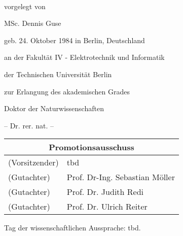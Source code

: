 \begin{titlepage}
    \begin{addmargin}[-1cm]{-3cm}
    \begin{center}
        \large  

        \hfill

        \vfill

        \begingroup
            \color{Maroon}\spacedallcaps{\myTitle} \\ \bigskip
        \endgroup

				\vspace{0.7cm}	
				vorgelegt von
				
				\vspace{0.7cm}	
				MSc. Dennis Guse
				
				geb. 24. Oktober 1984 in Berlin, Deutschland

				\vspace{1.7cm}
				an der Fakultät IV - Elektrotechnik und Informatik
				
				der Technischen Universität Berlin
				
				zur Erlangung des akademischen Grades

				\vspace{0.7cm}
				Doktor der Naturwissenschaften
				
				-- Dr. rer. nat. --

				\vspace{2.2cm}
				
				\centering
				\large
				\begin{tabular}{ll}
				\multicolumn{2}{c}{Promotionsausschuss} \\
				\hline				
				(Vorsitzender) & tbd \\
				(Gutachter)	& Prof. Dr-Ing. Sebastian Möller \\
				(Gutachter)	& Prof. Dr. Judith Redi \\
				(Gutachter)	& Prof. Dr. Ulrich Reiter \\
				\end{tabular}
			
				\vspace{1.7cm}				
				Tag der wissenschaftlichen Aussprache: tbd.


\end{center}
\end{addmargin}
\end{titlepage}
